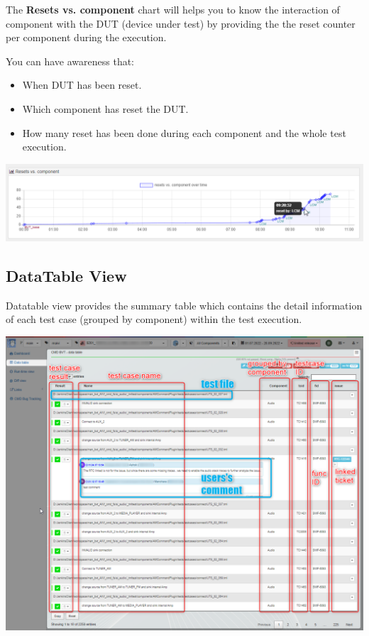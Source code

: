 The \textbf{Resets vs. component} chart will helps you to know the interaction
of component with the DUT (device under test) by providing the the reset counter
per component during the execution.

You can have awareness that:
\begin{itemize}
   \item When DUT has been reset.
   \item Which component has reset the DUT.
   \item How many reset has been done during each component and the whole
         test execution.
\end{itemize}

\includegraphics[width=1\linewidth]
{./pictures/dashboard/reset_vs_component.png}

\hypertarget{datatable-view}{%
\subsection{DataTable View}\label{datatable-view}}

Datatable view provides the summary table which contains the detail information 
of each test case (grouped by component) within the test execution.

\includegraphics[width=1\linewidth]{./pictures/view_datatable.png}

